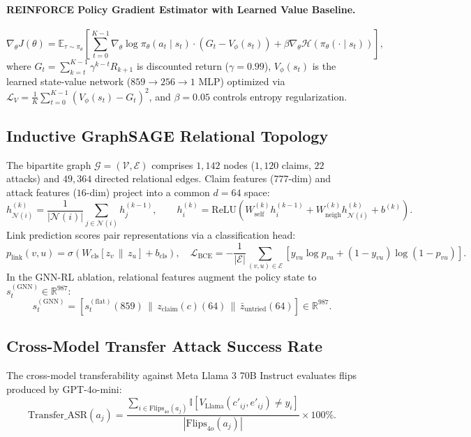 \paragraph{REINFORCE Policy Gradient Estimator with Learned Value Baseline.}
\begin{equation}
\nabla_\theta J(\theta) = \mathbb{E}_{\tau \sim \pi_\theta} \left[ \sum_{t=0}^{K-1} \nabla_\theta \log \pi_\theta(a_t \mid s_t) \cdot (G_t - V_\phi(s_t)) + \beta \nabla_\theta \mathcal{H}(\pi_\theta(\cdot \mid s_t)) \right],
\end{equation}
where $G_t = \sum_{k=t}^{K-1} \gamma^{k-t} R_{k+1}$ is discounted return ($\gamma = 0.99$), $V_\phi(s_t)$ is the learned state-value network ($859 \to 256 \to 1$ MLP) optimized via $\mathcal{L}_V = \frac{1}{K}\sum_{t=0}^{K-1} (V_\phi(s_t) - G_t)^2$, and $\beta = 0.05$ controls entropy regularization.

\subsection{Inductive GraphSAGE Relational Topology}

The bipartite graph $\mathcal{G} = (\mathcal{V}, \mathcal{E})$ comprises $1,142$ nodes ($1,120$ claims, $22$ attacks) and $49,364$ directed relational edges. Claim features ($777$-dim) and attack features ($16$-dim) project into a common $d=64$ space:
\begin{equation}
h_{\mathcal{N}(i)}^{(k)} = \frac{1}{|\mathcal{N}(i)|} \sum_{j \in \mathcal{N}(i)} h_j^{(k-1)}, \qquad h_i^{(k)} = \text{ReLU}\left( W_{\text{self}}^{(k)} h_i^{(k-1)} + W_{\text{neigh}}^{(k)} h_{\mathcal{N}(i)}^{(k)} + b^{(k)} \right).
\end{equation}
Link prediction scores pair representations via a classification head:
\begin{equation}
p_{\text{link}}(v, u) = \sigma\left( W_{\text{cls}} [z_v \,\|\, z_u] + b_{\text{cls}} \right), \quad \mathcal{L}_{\text{BCE}} = - \frac{1}{|\mathcal{E}|} \sum_{(v, u) \in \mathcal{E}} \left[ y_{vu} \log p_{vu} + (1 - y_{vu}) \log (1 - p_{vu}) \right].
\end{equation}
In the GNN-RL ablation, relational features augment the policy state to $s_t^{(\text{GNN})} \in \mathbb{R}^{987}$:
\begin{equation}
s_t^{(\text{GNN})} = \left[ s_t^{(\text{flat})} (859) \,\|\, z_{\text{claim}}(c) (64) \,\|\, \bar{z}_{\text{untried}} (64) \right] \in \mathbb{R}^{987}.
\end{equation}

\subsection{Cross-Model Transfer Attack Success Rate}

The cross-model transferability against Meta Llama 3 70B Instruct evaluates flips produced by GPT-4o-mini:
\begin{equation}
\text{Transfer\_ASR}(a_j) = \frac{\sum_{i \in \text{Flips}_{4o}(a_j)} \mathbb{I}\left[ V_{\text{Llama}}(c'_{ij}, e'_{ij}) \neq y_i \right]}{|\text{Flips}_{4o}(a_j)|} \times 100\%.
\end{equation}
